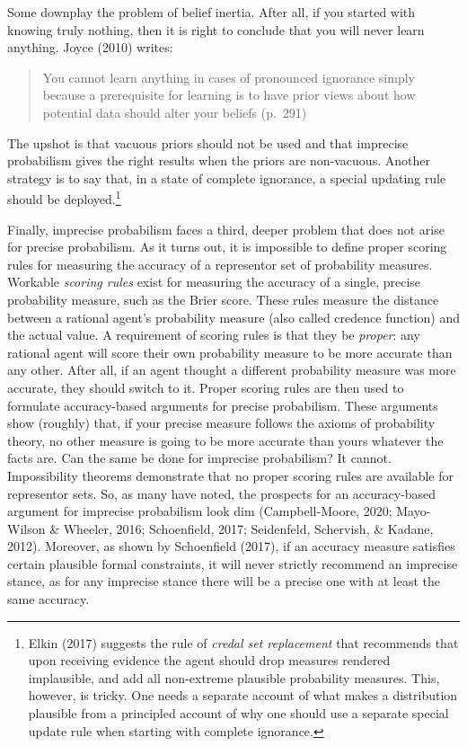 \documentclass[
  letterpaper,
  DIV=11,
  numbers=noendperiod]{scrartcl}
\begin{document}
Some downplay the problem of belief inertia. After all, if you started
with knowing truly nothing, then it is right to conclude that you will
never learn anything. Joyce (2010) writes:

\begin{quote}
You cannot learn anything in cases of pronounced ignorance simply
because a prerequisite for learning is to have prior views about how
potential data should alter your beliefs (p.~291)
\end{quote}

\noindent The upshot is that vacuous priors should not be used and that
imprecise probabilism gives the right results when the priors are
non-vacuous. Another strategy is to say that, in a state of complete
ignorance, a special updating rule should be deployed.\footnote{Elkin
  (2017) suggests the rule of \emph{credal set replacement} that
  recommends that upon receiving evidence the agent should drop measures
  rendered implausible, and add all non-extreme plausible probability
  measures. This, however, is tricky. One needs a separate account of
  what makes a distribution plausible from a principled account of why
  one should use a separate special update rule when starting with
  complete ignorance.}

Finally, imprecise probabilism faces a third, deeper problem that does
not arise for precise probabilism. As it turns out, it is impossible to
define proper scoring rules for measuring the accuracy of a representor
set of probability measures. Workable \emph{scoring rules} exist for
measuring the accuracy of a single, precise probability measure, such as
the Brier score. These rules measure the distance between a rational
agent's probability measure (also called credence function) and the
actual value. A requirement of scoring rules is that they be
\emph{proper}: any rational agent will score their own probability
measure to be more accurate than any other. After all, if an agent
thought a different probability measure was more accurate, they should
switch to it. Proper scoring rules are then used to formulate
accuracy-based arguments for precise probabilism. These arguments show
(roughly) that, if your precise measure follows the axioms of
probability theory, no other measure is going to be more accurate than
yours whatever the facts are. Can the same be done for imprecise
probabilism? It cannot. Impossibility theorems demonstrate that no
proper scoring rules are available for representor sets. So, as many
have noted, the prospects for an accuracy-based argument for imprecise
probabilism look dim (Campbell-Moore, 2020; Mayo-Wilson \& Wheeler,
2016; Schoenfield, 2017; Seidenfeld, Schervish, \& Kadane, 2012).
Moreover, as shown by Schoenfield (2017), if an accuracy measure
satisfies certain plausible formal constraints, it will never strictly
recommend an imprecise stance, as for any imprecise stance there will be
a precise one with at least the same accuracy.
\end{document}
